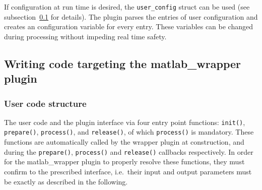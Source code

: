 \documentclass[11pt,a4paper,twoside]{article}
\newcommand{\+}{\discretionary{\mbox{\scriptsize$\hookleftarrow$}}{}{}}
\begin{document}
If configuration at run time is desired, the \texttt{user\_config}
struct can be used (see subsection~\ref{subsec:writing_code} for details).
The plugin parses the entries of user configuration and creates an
\mha{} configuration variable for every entry. These variables can be
changed during processing without impeding real time safety.

\subsection{Writing code targeting the matlab\_wrapper plugin}\label{subsec:writing_code}
\subsubsection{User code structure}
The user code and the plugin interface via four entry point functions:
\texttt{init()}, \texttt{prepare()}, \texttt{process()}, and \texttt{release()}, of which \texttt{process()} is mandatory.
These functions are automatically called by the wrapper plugin at construction, and during the \texttt{prepare()},
\texttt{process()} and \texttt{release()} callbacks respectively.
In order for the matlab\_wrapper plugin to properly resolve these functions, they must confirm to the prescribed interface,
i.e.\ their input and output parameters must be exactly as described in the following.\\
\end{document}
